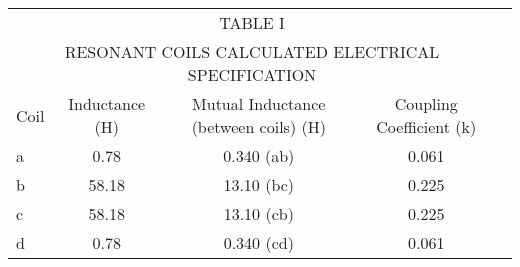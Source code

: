 \documentclass{article}
\begin{document}
\begin{table}
 \begin{center}
 \begin{tabular}{lcccc}
\multicolumn{4}{c}{TABLE I}\\
\multicolumn{4}{c}{RESONANT COILS CALCULATED ELECTRICAL SPECIFICATION}\\
Coil	&	Inductance (\mu H) & Mutual Inductance (between coils) (\mu H) & Coupling Coefficient (k)\\\hline
	a	&	0.78	&	0.340 (ab)		&	0.061\\
	b	&	58.18	&	13.10 (bc)		&	0.225\\
	c	&	58.18	&	13.10 (cb)		&	0.225\\
	d	&	0.78	&	0.340 (cd)		&	0.061\\
 \hline
  \end{tabular}
 \end{center}
\end{table} 
\end{document}
